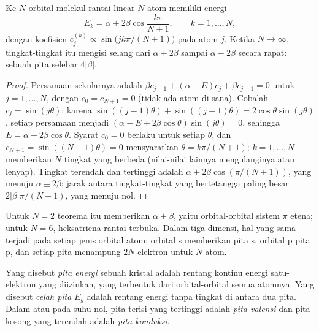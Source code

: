 \begin{theorem}\label{thm:b3:solid-state:chain}
Ke-$N$ orbital molekul rantai linear $N$ atom memiliki energi
\[
  E_k = \alpha + 2\beta\cos\frac{k\pi}{N + 1}, \qquad k = 1, \dots, N,
\]
dengan koefisien $c_j^{(k)} \propto \sin\bigl(jk\pi/(N + 1)\bigr)$ pada atom $j$. Ketika $N \to \infty$, tingkat-tingkat itu mengisi
selang dari $\alpha + 2\beta$ sampai $\alpha - 2\beta$ secara rapat: sebuah pita selebar $4|\beta|$.
\end{theorem}

\begin{proof}
Persamaan sekularnya adalah $\beta c_{j-1} + (\alpha - E)c_j + \beta c_{j+1} = 0$ untuk $j = 1, \dots, N$, dengan $c_0 = c_{N+1} = 0$
(tidak ada atom di sana). Cobalah $c_j = \sin(j\theta)$: karena $\sin((j - 1)\theta) + \sin((j + 1)\theta) = 2\cos\theta\sin(j\theta)$, setiap
persamaan menjadi $(\alpha - E + 2\beta\cos\theta)\sin(j\theta) = 0$, sehingga $E = \alpha + 2\beta\cos\theta$. Syarat $c_0 = 0$ berlaku
untuk setiap $\theta$, dan $c_{N+1} = \sin((N + 1)\theta) = 0$ mensyaratkan $\theta = k\pi/(N + 1)$; $k = 1, \dots, N$ memberikan $N$ tingkat
yang berbeda (nilai-nilai lainnya mengulanginya atau lenyap). Tingkat terendah dan tertinggi adalah
$\alpha \pm 2\beta\cos(\pi/(N + 1))$, yang menuju $\alpha \pm 2\beta$; jarak antara tingkat-tingkat yang bertetangga paling besar
$2|\beta|\pi/(N + 1)$, yang menuju nol.
\end{proof}

Untuk $N = 2$ teorema itu memberikan $\alpha \pm \beta$, yaitu orbital-orbital sistem $\pi$ etena; untuk
$N = 6$, heksatriena rantai terbuka. Dalam tiga dimensi, hal yang sama terjadi pada
setiap jenis orbital atom: orbital s memberikan pita s, orbital p pita p,
dan setiap pita menampung $2N$ elektron untuk $N$ atom.

\begin{definition}[Pita]\label{def:b3:solid-state:band}
Yang disebut \emph{pita energi} sebuah kristal adalah rentang kontinu
energi satu-elektron yang diizinkan, yang terbentuk dari orbital-orbital semua atomnya. Yang disebut
\emph{celah pita} $E_g$ adalah rentang energi tanpa tingkat di antara dua
pita. Dalam  atau  pada suhu nol, pita terisi yang
tertinggi adalah \emph{pita valensi} dan pita kosong yang terendah
adalah \emph{pita konduksi}.
\end{definition}

